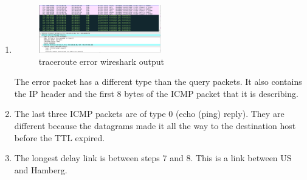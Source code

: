 \documentclass[11pt]{article}
\begin{document}
\begin{enumerate}[label=(\alph*)]
{\begin{enumerate} [label=(\arabic*)]
{		The ICMP traceroute echo packet has the same fields as the ping packets
	}
	
	\item {
		\begin{figure}[h] %
		\centering
		\includegraphics[width=0.5\textwidth]{traceroute-error-output}
		\caption{traceroute error wireshark output}
		\end{figure}
		
		The error packet has a different type than the query packets. It also contains 
		the IP header and the first 8 bytes of the ICMP packet that it is describing.
	}
	
	\item {
		The last three ICMP packets are of type 0 (echo (ping) reply). They are different 
		because the datagrams made it all the way to the destination host before the TTL 
		expired.
	}
	
	\item {
		The longest delay link is between steps 7 and 8. This is a link between US and Hamberg. 
	}
	\end{enumerate}
}
\end{enumerate}
\end{document}
